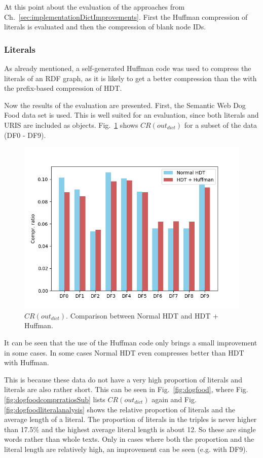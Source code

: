 At this point  about the evaluation of the approaches from Ch.~\ref{sec:implementationDictImprovements}. First the Huffman compression of literals is evaluated and then the compression of blank node IDs. 


\subsubsection{Literals}

As already mentioned, a self-generated Huffman code was used to compress the literals of an RDF graph, as it is likely to get a better compression than the with the prefix-based compression of HDT.

Now the results of the evaluation are presented. First, the Semantic Web Dog Food data set is used. This is well suited for an evaluation, since both literals and URIS are included as objects. Fig.~\ref{fig:dogfoodcomprratios} shows $CR(out_{dict})$ for a subset of the data (DF0 - DF9). 


\begin{figure}
	\centering
	\includegraphics[width=0.7\linewidth]{figures/4_evaluation/dogFoodComprRatios}
	\caption{$CR(out_{dict})$. Comparison between Normal HDT and HDT + Huffman.}
	\label{fig:dogfoodcomprratios}
\end{figure}

It can be seen that the use of the Huffman code only brings a small improvement in some cases. In some cases Normal HDT even compresses better than HDT with Huffman.

This is because these data do not have a very high proportion of literals and literals are also rather short. This can be seen in Fig.~\ref{fig:dogfood}, where Fig.\ref{fig:dogfoodcomprratiosSub} lists $CR(out_{dict})$ again and Fig.\ref{fig:dogfoodliteralanalysis} shows the relative proportion of literals and the average length of a literal. The proportion of literals in the triples is never higher than 17.5\% and the highest average literal length is about 12. So these are single words rather than whole texts. Only in cases where both the proportion and the literal length are relatively high, an improvement can be seen (e.g. with DF9).


